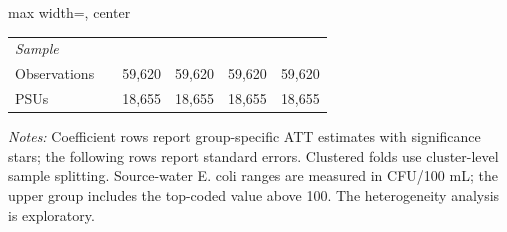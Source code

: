 \begin{landscape}
\begin{table}[p]
\begin{adjustbox}{max width=\linewidth, center}
\begin{tabular}{llcccc}
\multicolumn{6}{l}{\textit{Sample}} \\
\quad Observations &  & 59,620 & 59,620 & 59,620 & 59,620 \\
\quad PSUs &  & 18,655 & 18,655 & 18,655 & 18,655 \\
\bottomrule
\end{tabular}
\end{adjustbox}
\par\vspace{3pt}
\begin{minipage}{\linewidth}\footnotesize \textit{Notes:} Coefficient rows report group-specific ATT estimates with significance stars; the following rows report standard errors. Clustered folds use cluster-level sample splitting. Source-water E. coli ranges are measured in CFU/100 mL; the upper group includes the top-coded value above 100. The heterogeneity analysis is exploratory.\end{minipage}
\end{table}
\end{landscape}